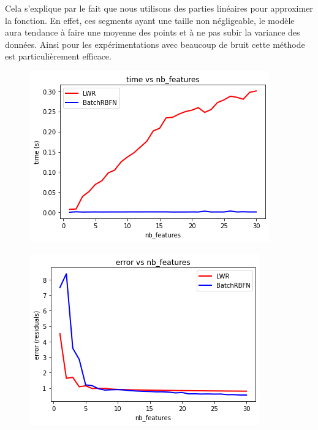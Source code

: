 \documentclass[french,12pt]{article}
\begin{document}
Cela s’explique par le fait que nous utilisons des parties linéaires pour approximer la fonction. En effet, ces segments ayant une taille non négligeable, le modèle aura tendance à faire une moyenne des points et à ne pas subir la variance des données. Ainsi pour les expérimentations avec beaucoup de bruit cette méthode est particulièrement efficace.

\begin{figure}[ht]
\centering
\begin{minipage}{.45\textwidth}
	\centering
	\includegraphics[width=\textwidth]{lwr_vs_rbfn_time.png}
	\label{fig:lwr_vs_rbfn_time}
\end{minipage}
\hfill
\begin{minipage}{.45\textwidth}
	\centering
	\includegraphics[width=\textwidth]{lwr_vs_rbfn_error.png}

\end{minipage}
\end{figure}
\end{document}
